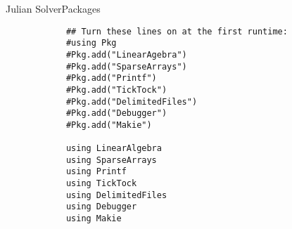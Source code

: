 \documentclass[\string~/GitHub/sthlmNordBeamerTheme/sthlmNordLightDemo.tex]{subfiles}
\begin{document}
\begin{frame}{Julian Solver}{Packages}

	\begin{center}
        \begin{verbatim}
            ## Turn these lines on at the first runtime:
            #using Pkg
            #Pkg.add("LinearAgebra")
            #Pkg.add("SparseArrays")
            #Pkg.add("Printf")
            #Pkg.add("TickTock")
            #Pkg.add("DelimitedFiles")
            #Pkg.add("Debugger")
            #Pkg.add("Makie")
            
            using LinearAlgebra
            using SparseArrays
            using Printf
            using TickTock
            using DelimitedFiles
            using Debugger
            using Makie
        \end{verbatim}
    \end{center}

\end{frame}
\end{document}
